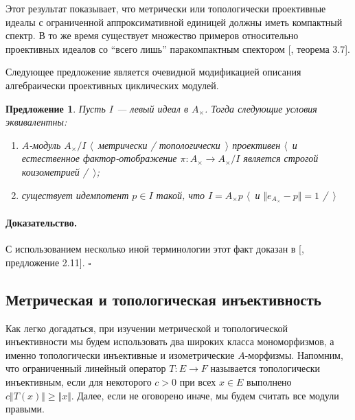 \documentclass[12pt]{article}
\newtheorem{proposition}[theorem]{Предложение}
\renewenvironment{proof}{\paragraph{Доказательство.}}{\hfill$\square$\medskip}
\begin{document}
Этот результат показывает, что метрически или топологически проективные идеалы с
ограниченной аппроксимативной единицей должны иметь компактный спектр. В то же
время существует множество примеров относительно проективных идеалов со ``всего
лишь'' паракомпактным спектором [\cite{HelHomolBanTopAlg}, теорема 3.7].

Следующее предложение является очевидной модификацией описания алгебраически
проективных циклических модулей.

\begin{proposition}\label{MetTopProjCycModCharac} Пусть $I$ --- левый идеал в
    $A_\times $. Тогда следующие условия эквивалентны:
    \begin{enumerate}[label = (\roman*)]

        \item $A$-модуль $A_\times /I$ $\langle$~метрически /
              топологически~$\rangle$ проективен $\langle$~и естественное
              фактор-отображение $\pi:A_\times \to A_\times /I$ является строгой
              коизометрией /~$\rangle$;

        \item существует идемпотент $p\in I$ такой, что 
              $I=A_\times  p$ $\langle$~и
              $\Vert e_{A_\times }-p\Vert= 1$ /~$\rangle$
    \end{enumerate}
\end{proposition}
\begin{proof} С использованием несколько иной терминологии этот факт доказан в
    [\cite{WhiteInjmoduAlg}, предложение 2.11].
\end{proof}


\subsection{Метрическая и топологическая
    инъективность}\label{SubSectionMetricAndTopologicalInjectivity}

Как легко догадаться, при изучении метрической и топологической инъективности мы
будем использовать два широких класса мономорфизмов, а именно топологически
инъективные и изометрические $A$-морфизмы. Напомним, что ограниченный линейный
оператор $T:E\to F$ называется топологически инъективным, если для некоторого
$c>0$ при всех $x\in E$ выполнено $c\Vert T(x)\Vert\geq \Vert x\Vert$. Далее,
если не оговорено иначе, мы будем считать все модули правыми.
\end{document}
